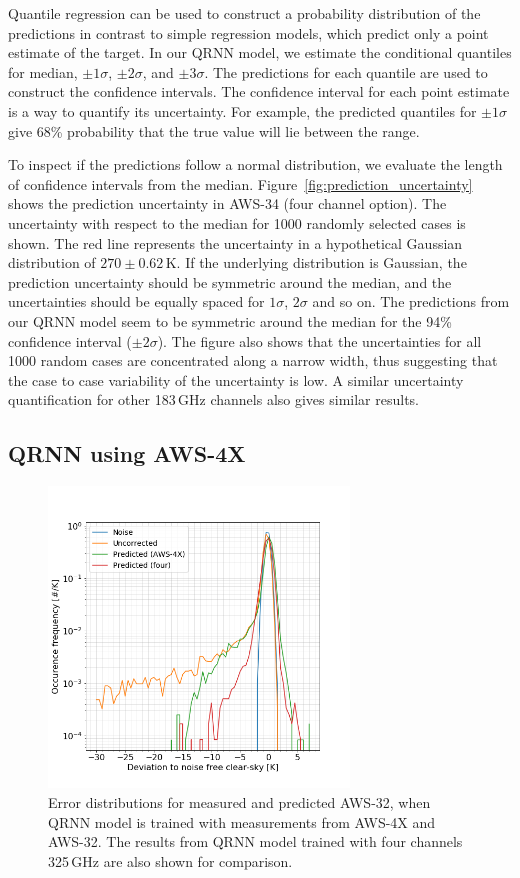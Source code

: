 \documentclass[12pt]{article}
\begin{document}
Quantile regression can be used to construct a probability distribution of the
predictions in contrast to simple regression models, which predict only a point
estimate of the target. In our QRNN model, we estimate the conditional
quantiles for median, $\pm 1\sigma$, $\pm 2\sigma$, and $\pm 3\sigma$. The
predictions for each quantile are used to construct the confidence intervals.
The confidence interval for each point estimate is a way to quantify its
uncertainty. For example, the predicted quantiles for $\pm 1 \sigma$ give 68\%
probability that the true value will lie between the range.

To inspect if the predictions follow a normal distribution, we evaluate the
length of confidence intervals from the median.
Figure~\ref{fig:prediction_uncertainty} shows the prediction uncertainty in
AWS-34 (four channel option). The uncertainty with respect to the median for
1000 randomly selected cases is shown. The red line represents the uncertainty
in a hypothetical Gaussian distribution of $270\pm0.62$\,K. If the underlying
distribution is Gaussian, the prediction uncertainty should be symmetric around
the median, and the uncertainties should be equally spaced for $1\sigma$,
$2\sigma$ and so on. The predictions from our QRNN model seem to be symmetric
around the median for the 94\% confidence interval ($\pm 2 \sigma$). The figure
also shows that the uncertainties for all 1000 random cases are concentrated
along a narrow width, thus suggesting that the case to case variability of the
uncertainty is low. A similar uncertainty quantification for other 183\,GHz
channels also gives similar results.

\subsection{QRNN using AWS-4X}
%
\begin{figure}[!tb]
	\centering
	\includegraphics[height=80mm]{Channel_C32_C4X.png}
	\caption{ Error distributions for measured and predicted AWS-32, when QRNN  model is trained with measurements from AWS-4X and AWS-32. The results from QRNN model trained with four channels 325\,GHz are also shown for comparison. }
	\label{fig:qrnn_C32_C4X:deviations}
\end{figure}
\end{document}
